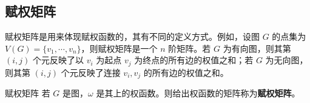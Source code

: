 \subsection{赋权矩阵}

赋权矩阵是用来体现赋权函数的，其有不同的定义方式。例如，设图 $G$ 的点集为 $V(G)=\{v_1,\cdots,v_n\}$，则赋权矩阵是一个 $n$ 阶矩阵。若 $G$ 为有向图，则其第 $(i,j)$ 个元反映了以 $v_i$ 为起点 $v_j$ 为终点的所有边的权值之和；若 $G$ 为无向图，则其第 $(i,j)$ 个元反映了连接 $v_i,v_j$ 的所有边的权值之和。
\begin{definition}{赋权矩阵}
若 $G$ 是图，$\omega$ 是其上的权函数。则给出权函数的矩阵称为\textbf{赋权矩阵}。
\end{definition}









